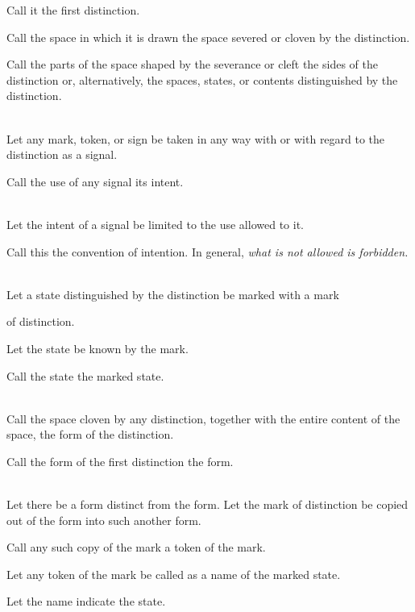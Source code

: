 \documentclass[a4paper]{article}
\theoremstyle{remark}
\begin{document}
Call it the first distinction.

Call the space in which it is drawn the space severed or cloven by the distinction.

Call the parts of the space shaped by the severance or cleft the sides of the distinction or, alternatively, the spaces, states, or contents distinguished by the distinction.
\\\\

Let any mark, token, or sign be taken in any way with or with regard to the distinction as a signal.

Call the use of any signal its intent.   
\\\\

Let the intent of a signal be limited to the use allowed to it.

Call this the convention of intention. In general, \textit{what is not allowed is forbidden.}
\\\\

Let a state distinguished by the distinction be marked with a mark
\begin{form}
\end{form} of distinction.

Let the state be known by the mark.

Call the state the marked state.
\\\\

Call  the  space  cloven  by  any  distinction,  together  with  the  entire  content  of  the  space,  the  form  of  the  distinction.

Call  the  form  of  the  first  distinction  the  form.
\\\\

Let  there  be  a  form  distinct  from  the  form.  Let  the  mark  of  distinction  be  copied  out  of  the  form  into  such  another  form.

Call  any  such  copy  of  the  mark  a  token  of  the  mark.

Let  any token  of the mark  be  called  as  a name  of the  marked  state.

Let  the  name  indicate  the  state.
\\\\
\end{document}
